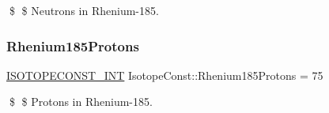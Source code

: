 \$ \$ Neutrons in Rhenium-\/185. \mbox{\label{group___isotope_const-_rhenium-_re185_gab9bce09723d5400d84fdc38d6f624f4a}} 
\subsubsection{\texorpdfstring{Rhenium185\+Protons}{Rhenium185Protons}}
{\footnotesize\ttfamily \mbox{\hyperlink{group___isotope_const-_macros_ga5f18360b3e99483a35c32d789e62621c}{I\+S\+O\+T\+O\+P\+E\+C\+O\+N\+S\+T\+\_\+\+I\+NT}} Isotope\+Const\+::\+Rhenium185\+Protons = 75}

\$ \$ Protons in Rhenium-\/185. 